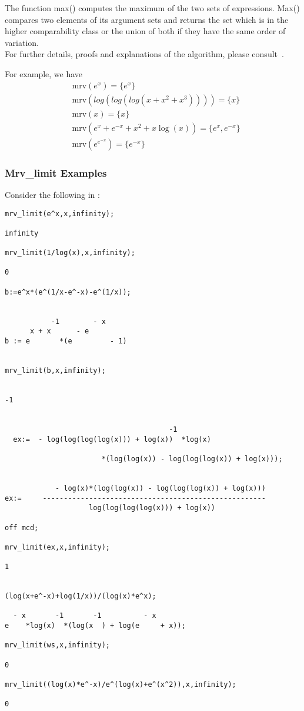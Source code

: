The function max() computes the maximum of the two sets of expressions. Max() compares two elements of its argument sets and returns the set which is in the higher comparability class or the union of both if they have the same order of variation. \\[\baselineskip]
%
For further details, proofs and explanations of the algorithm, please consult~\cite{Grn96}.

For example, we have
\begin{align*}
&\text{mrv}(e^{x})=\{e^x\} \\
&\text{mrv}(log(log(log(x+x^2+x^3))))=\{x\}  \\
&\text{mrv}(x)=\{x\} \\
&\text{mrv}(e^x+e^{-x}+x^2+x \log(x))= \{e^x,e^{-x} \} \\
&\text{mrv}(e^{e^{-x}})=\{e^{-x} \} 
\end{align*}

\subsubsection{Mrv\_limit Examples}
Consider the following in \REDUCE:
\begin{verbatim}
mrv_limit(e^x,x,infinity);

infinity

mrv_limit(1/log(x),x,infinity);

0

b:=e^x*(e^(1/x-e^-x)-e^(1/x));


           -1        - x
      x + x      - e
b := e       *(e         - 1)


mrv_limit(b,x,infinity);


-1


                                       -1
  ex:=  - log(log(log(log(x))) + log(x))  *log(x)

                       *(log(log(x)) - log(log(log(x)) + log(x)));


            - log(x)*(log(log(x)) - log(log(log(x)) + log(x)))
ex:=     -----------------------------------------------------
                    log(log(log(log(x))) + log(x))

off mcd;

mrv_limit(ex,x,infinity);

1


(log(x+e^-x)+log(1/x))/(log(x)*e^x);

  - x       -1       -1          - x
e    *log(x)  *(log(x  ) + log(e     + x));

mrv_limit(ws,x,infinity);

0

mrv_limit((log(x)*e^-x)/e^(log(x)+e^(x^2)),x,infinity);

0

\end{verbatim}
\normalsize
